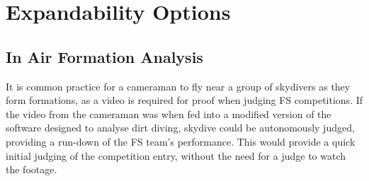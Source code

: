 \documentclass[adpaper,12pt]{book}
\begin{document}
%
\section{Expandability Options}
	\subsection{In Air Formation Analysis}
	It is common practice for a cameraman to fly near a group of skydivers as they form formations, as a video is required for proof when judging FS competitions.
	If the video from the cameraman was when fed into a modified version of the software designed to analyse dirt diving, skydive could be autonomously judged, providing a run-down of the FS team's performance. This would provide a quick initial judging of the competition entry, without the need for a judge to watch the footage.
\end{document}
